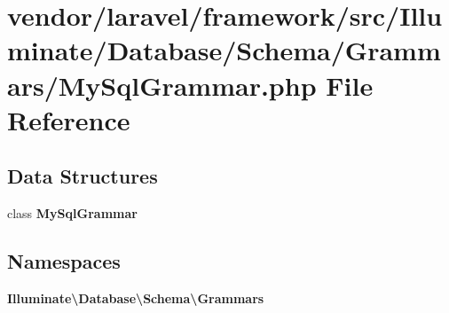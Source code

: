 \section{vendor/laravel/framework/src/\+Illuminate/\+Database/\+Schema/\+Grammars/\+My\+Sql\+Grammar.php File Reference}
\label{_schema_2_grammars_2_my_sql_grammar_8php}
\subsection*{Data Structures}
\begin{DoxyCompactItemize}
\item 
class {\bf My\+Sql\+Grammar}
\end{DoxyCompactItemize}
\subsection*{Namespaces}
\begin{DoxyCompactItemize}
\item 
 {\bf Illuminate\textbackslash{}\+Database\textbackslash{}\+Schema\textbackslash{}\+Grammars}
\end{DoxyCompactItemize}

